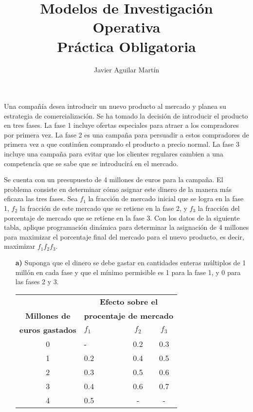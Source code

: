 \documentclass[twoside]{article}
\begin{document}
\title{Modelos de Investigación Operativa\\ Práctica Obligatoria}
\author{Javier Aguilar Martín}
\maketitle



\begin{ejercicio}{1}
Una compañía desea introducir un nuevo producto al mercado y planea su estrategia de comercialización. Se ha tomado la decisión de introducir el producto en tres fases. La fase 1 incluye ofertas especiales para atraer a los compradores por primera vez. La fase 2 es una campaña para persuadir a estos compradores de primera vez a que continúen comprando el producto a precio normal. La fase 3 incluye una campaña para evitar que los clientes regulares cambien a una competencia que se sabe que se introducirá en el mercado.

Se cuenta con un presupuesto de 4 millones de euros para la campaña. El problema consiste en determinar cómo asignar este dinero de la manera más eficaza las tres fases. Sea $f_1$ la fracción de mercado inicial que se logra en la fase 1, $f_2$ la fracción de este mercado que se retiene en la fase 2, y $f_3$ la fracción del porcentaje de mercado que se retiene en la fase 3. Con los datos de la siguiente tabla, aplique programación dinámica para determinar la asignación de 4 millones para maximizar el porcentaje final del mercado para el nuevo producto, es decir, maximizar $f_1f_2f_3$. 
\begin{itemize}
\item[\textbf{a)}] Suponga que el dinero se debe gastar en cantidades enteras múltiplos de 1 millón en cada fase y que el mínimo permisible es 1 para la fase 1, y 0 para las fases 2 y 3.
\begin{center}
\begin{tabular}{c|lcc}
 & \multicolumn{3}{c}{\textbf{Efecto sobre el}}\\
\textbf{Millones de } & \multicolumn{3}{c}{\textbf{procentaje de mercado}} \\\cline{2-4}
\textbf{euros gastados} & $f_1\qquad$ & $f_2$ & $f_3$\\
\hline
0 & - & 0.2   & 0.3\\
1 & 0.2 & 0.4 & 0.5\\
2 & 0.3 & 0.5 & 0.6\\
3 & 0.4 & 0.6 & 0.7\\
4 & 0.5 & - & -
\end{tabular}
\end{center}


\end{itemize}
\end{ejercicio}
\end{document}

